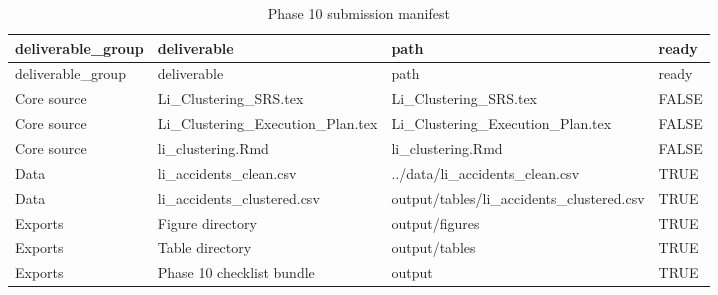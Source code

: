 \documentclass[
]{article}
\begin{document}
\begin{longtable}[]{@{}
  >{\raggedright\arraybackslash}p{}
  >{\raggedright\arraybackslash}p{}
  >{\raggedright\arraybackslash}p{}
  >{\raggedright\arraybackslash}p{}@{}}
\caption{Phase 10 submission manifest}\tabularnewline
\toprule\noalign{}
\begin{minipage}[b]{\linewidth}\raggedright
deliverable\_group
\end{minipage} & \begin{minipage}[b]{\linewidth}\raggedright
deliverable
\end{minipage} & \begin{minipage}[b]{\linewidth}\raggedright
path
\end{minipage} & \begin{minipage}[b]{\linewidth}\raggedright
ready
\end{minipage} \\
\midrule\noalign{}
\endfirsthead
\toprule\noalign{}
\begin{minipage}[b]{\linewidth}\raggedright
deliverable\_group
\end{minipage} & \begin{minipage}[b]{\linewidth}\raggedright
deliverable
\end{minipage} & \begin{minipage}[b]{\linewidth}\raggedright
path
\end{minipage} & \begin{minipage}[b]{\linewidth}\raggedright
ready
\end{minipage} \\
\midrule\noalign{}
\endhead
\bottomrule\noalign{}
\endlastfoot
Core source & Li\_Clustering\_SRS.tex & Li\_Clustering\_SRS.tex &
FALSE \\
Core source & Li\_Clustering\_Execution\_Plan.tex &
Li\_Clustering\_Execution\_Plan.tex & FALSE \\
Core source & li\_clustering.Rmd & li\_clustering.Rmd & FALSE \\
Data & li\_accidents\_clean.csv & ../data/li\_accidents\_clean.csv &
TRUE \\
Data & li\_accidents\_clustered.csv &
output/tables/li\_accidents\_clustered.csv & TRUE \\
Exports & Figure directory & output/figures & TRUE \\
Exports & Table directory & output/tables & TRUE \\
Exports & Phase 10 checklist bundle & output & TRUE \\
\end{longtable}
\end{document}
